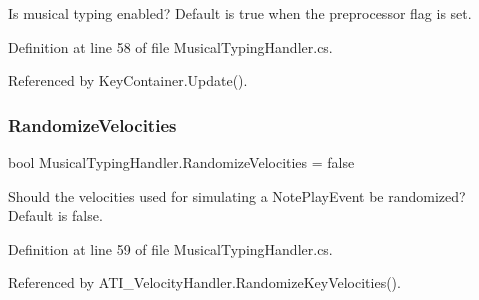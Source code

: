 Is musical typing enabled? Default is true when the preprocessor flag is set. 



Definition at line 58 of file Musical\+Typing\+Handler.\+cs.



Referenced by Key\+Container.\+Update().

\mbox{\label{group___mus_typ_pub_var_gad09f6f673034d9cd95f699838c9518d5}} 
\subsubsection{\texorpdfstring{Randomize\+Velocities}{RandomizeVelocities}}
{\footnotesize\ttfamily bool Musical\+Typing\+Handler.\+Randomize\+Velocities = false}



Should the velocities used for simulating a Note\+Play\+Event be randomized? Default is false. 



Definition at line 59 of file Musical\+Typing\+Handler.\+cs.



Referenced by A\+T\+I\+\_\+\+Velocity\+Handler.\+Randomize\+Key\+Velocities().

